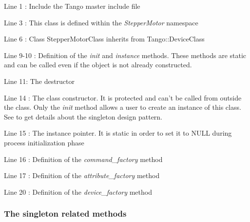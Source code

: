 Line 1 : Include the Tango master include file

Line 3 : This class is defined within the \emph{StepperMotor} namespace

Line 6 : Class StepperMotorClass inherits from Tango::DeviceClass

Line 9-10 : Definition of the \emph{init} and \emph{instance}
methods. These methods are static and can be called even if the object
is not already constructed.

Line 11: The destructor

Line 14 : The class constructor. It is protected and can't be called
from outside the class. Only the \emph{init} method allows a user
to create an instance of this class. See \cite{Patterns} to get details
about the singleton design pattern.

Line 15 : The instance pointer. It is static in order to set it to
NULL during process initialization phase

Line 16 : Definition of the \emph{command\_factory}
method

Line 17 : Definition of the \emph{attribute\_factory}
method

Line 20 : Definition of the \emph{device\_factory}
method

\subsubsection{The singleton related methods}



